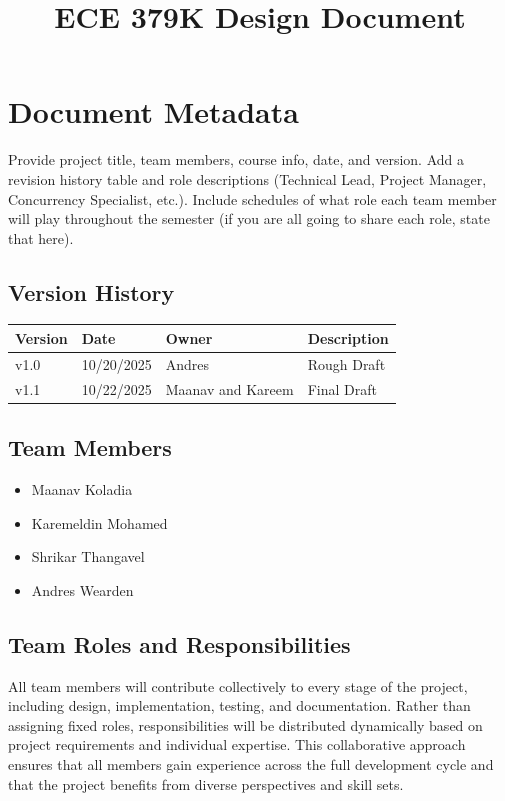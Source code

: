 \documentclass[12pt]{article}
\title{ECE 379K Design Document}
\date{}
\begin{document}
\maketitle

\section{Document Metadata}
Provide project title, team members, course info, date, and version. 
Add a revision history table and role descriptions (Technical Lead, Project Manager, Concurrency Specialist, etc.). Include schedules of what role each team member will play throughout the semester (if you are all going to share each role, state that here).

\subsection{Version History}

\begin{table}[h!]
\centering
\begin{tabular}{|l|l|l|l|}
\hline
\textbf{Version} & \textbf{Date} & \textbf{Owner} & \textbf{Description} \\
\hline
v1.0 & 10/20/2025 & Andres & Rough Draft \\
\hline
v1.1 & 10/22/2025 & Maanav and Kareem & Final Draft \\
\hline
\end{tabular}
\end{table}

\subsection{Team Members}

\begin{itemize}
    \item Maanav Koladia
    \item Karemeldin Mohamed
    \item Shrikar Thangavel
    \item Andres Wearden
\end{itemize}

\subsection{Team Roles and Responsibilities}

All team members will contribute collectively to every stage of the project, including design, implementation, testing, and documentation. Rather than assigning fixed roles, responsibilities will be distributed dynamically based on project requirements and individual expertise. This collaborative approach ensures that all members gain experience across the full development cycle and that the project benefits from diverse perspectives and skill sets.
\end{document}
